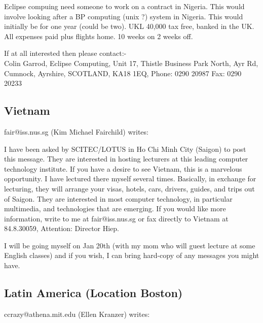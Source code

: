 Eclipse compuing need someone to work on a contract in
Nigeria. This would involve looking after a BP computing (unix ?)  
system in Nigeria. This would initially be for one year
(could be two). UKL 40,000 tax free, banked in the UK. All
expenses paid plus flights home. 10 weeks on 2 weeks off.

If at all interested then please contact:-\\
Colin Garrod,
Eclipse Computing,
Unit 17,
Thistle Business Park North,
Ayr Rd,
Cumnock,
Ayrshire,
SCOTLAND,
KA18 1EQ, Phone: 
0290 20987
Fax: 0290 20233

\subsection{Vietnam}
fair@iss.nus.sg (Kim Michael Fairchild) writes:

I have been asked by SCITEC/LOTUS in Ho Chi Minh City (Saigon) to post
this message.
They are interested in hosting lecturers at this leading computer
technology institute. 
If you have a desire to see Vietnam, this is a marvelous opportunity.
I have lectured there myself several times.
Basically, in exchange for lecturing, they will arrange your visas,
hotels, cars, drivers, guides, and trips out of Saigon. 
They are interested in most computer technology, in particular
multimedia, and technologies that are emerging. 
If you would like more information, write to me at fair@iss.nus.sg or
fax directly to Vietnam at 84.8.30059, Attention: Director Hiep. 

I will be going myself on Jan 20th (with my mom who will guest lecture
at some English classes) and if you wish, I can bring
hard-copy of any messages you might have. 

\subsection{Latin America (Location Boston)}
ccrazy@athena.mit.edu (Ellen Kranzer) writes:

